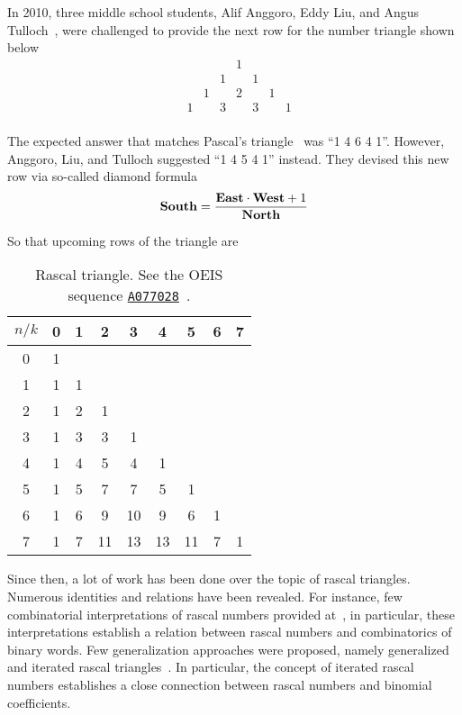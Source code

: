 In 2010, three middle school students, Alif Anggoro, Eddy Liu, and Angus Tulloch~\cite{anggoro2010rascal},
were challenged to provide the next row for the number triangle shown below
\[
    \begin{array}{cccccccc}
        &   &   &   & 1 &   &   &   \\
        &   &   & 1 &   & 1 &   &   \\
        &   & 1 &   & 2 &   & 1 &   \\
        & 1 &   & 3 &   & 3 &   & 1 \\
    \end{array}
\]

The expected answer that matches Pascal's triangle~\cite{sloane1994pascal} was ``1 4 6 4 1''.
However, Anggoro, Liu, and Tulloch suggested ``1 4 5 4 1'' instead.
They devised this new row via so-called diamond formula
\begin{align*}
    \mathbf{South}  = \frac{\mathbf{East} \cdot \mathbf{West} + 1}{\mathbf{North}}
\end{align*}

So that upcoming rows of the triangle are
\begin{table}[H]
    \begin{center}
        \setlength\extrarowheight{-6pt}
        \begin{tabular}{c|cccccccc}
            $n/k$ & 0 & 1 & 2  & 3  & 4  & 5  & 6 & 7 \\
            \hline
            0     & 1 &   &    &    &    &    &   &   \\
            1     & 1 & 1 &    &    &    &    &   &   \\
            2     & 1 & 2 & 1  &    &    &    &   &   \\
            3     & 1 & 3 & 3  & 1  &    &    &   &   \\
            4     & 1 & 4 & 5  & 4  & 1  &    &   &   \\
            5     & 1 & 5 & 7  & 7  & 5  & 1  &   &   \\
            6     & 1 & 6 & 9  & 10 & 9  & 6  & 1 &   \\
            7     & 1 & 7 & 11 & 13 & 13 & 11 & 7 & 1
        \end{tabular}
    \end{center}
    \caption{Rascal triangle. See the OEIS sequence \href{https://oeis.org/A077028}{\texttt{A077028}}~\cite{sloane2002rascal}.}
    \label{tab:rascal-triangle-i-1}
\end{table}


Since then, a lot of work has been done over the topic of rascal triangles.
Numerous identities and relations have been revealed.
For instance, few combinatorial interpretations of rascal numbers provided at~\cite{gibbs2024two}, in particular,
these interpretations establish a relation between rascal numbers and combinatorics of binary words.
Few generalization approaches were proposed, namely generalized
and iterated rascal triangles~\cite{hotchkiss2019generalized,gregory2023iterated}.
In particular, the concept of iterated rascal numbers establishes a close connection between rascal numbers and binomial
coefficients.
